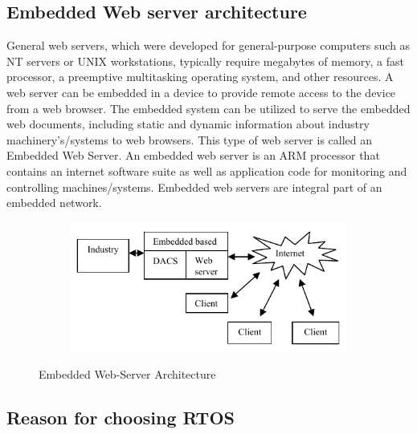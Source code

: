 \documentclass{FR16}
\begin{document}
\subsection{Embedded Web server architecture}
General web servers, which were developed for general-purpose computers such as NT servers or UNIX workstations, typically require megabytes of memory, a fast processor, a preemptive multitasking operating system, and other resources. A web server can be embedded in a device to provide remote access to the device from a web
browser. The embedded system can be utilized to serve the embedded web documents, including static and dynamic
information about industry machinery's/systems to web browsers. This type of web server is called an Embedded Web Server.
An embedded web server is an ARM processor that contains an internet software suite as well as
application code for monitoring and controlling machines/systems. Embedded web servers are integral part of an
embedded network.

  \begin{figure}[H]
 
    \begin{subfigure}{\textwidth}
    \includegraphics[scale=0.8]{embedded_web_server.png} 
    \label{fig:DJp1}
    \end{subfigure}
 
 \caption{Embedded Web-Server Architecture}
\label{fig6}
\end{figure}



\subsection{Reason for choosing RTOS}
\end{document}
